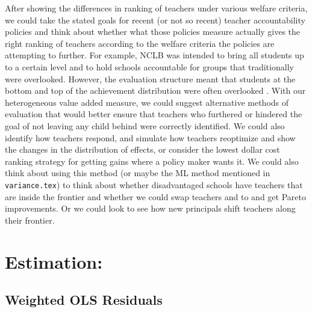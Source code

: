 \documentclass[letterpaper,12pt]{article}
\begin{document}
After showing the differences in ranking of teachers under various welfare criteria, we could take the stated goals for recent (or not so recent) teacher accountability policies and think about whether what those policies measure actually gives the right ranking of teachers according to the welfare criteria the policies are attempting to further. For example, NCLB was intended to bring all students up to a certain level and to hold schools accountable for groups that traditionally were overlooked. However, the evaluation structure meant that students at the bottom and top of the achievement distribution were often overlooked \citep{neal2010left}. With our heterogeneous value added measure, we could suggest alternative methods of evaluation that would better ensure that teachers who furthered or hindered the goal of not leaving any child behind were correctly identified. We could also identify how teachers respond, and simulate how teachers reoptimize and show the changes in the distribution of effects, or consider the lowest dollar cost ranking strategy for getting gains where a policy maker wants it. We could also think about using this method (or maybe the ML method mentioned in \texttt{variance.tex}) to think about whether disadvantaged schools have teachers that are inside the frontier and whether we could swap teachers and to and get Pareto improvements. Or we could look to see how new principals shift teachers along their frontier.



\section{Estimation:}
\subsection{Weighted OLS Residuals}
\end{document}
